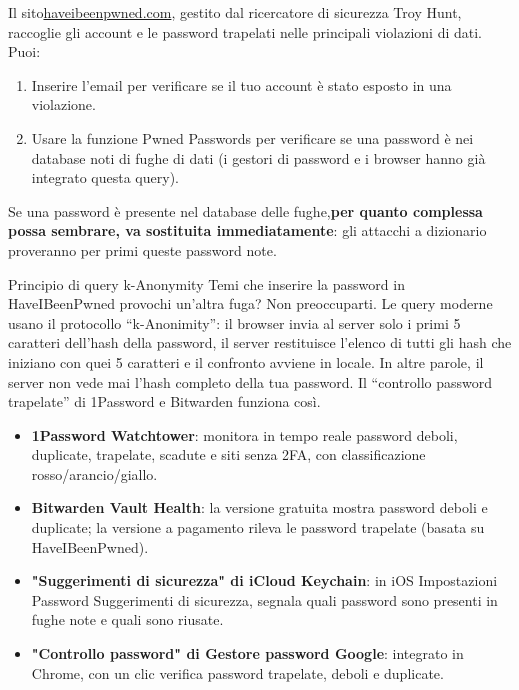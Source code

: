 
Il sito\href{https://haveibeenpwned.com}{haveibeenpwned.com}, gestito dal ricercatore di sicurezza Troy Hunt, raccoglie gli account e le password trapelati nelle principali violazioni di dati. Puoi:

\begin{enumerate}
  \item Inserire l'email per verificare se il tuo account è stato esposto in una violazione.
  \item Usare la funzione Pwned Passwords per verificare se una password è nei database noti di fughe di dati (i gestori di password e i browser hanno già integrato questa query).
\end{enumerate}

Se una password è presente nel database delle fughe,\textbf{per quanto complessa possa sembrare, va sostituita immediatamente}: gli attacchi a dizionario proveranno per primi queste password note.

\begin{tcbinfo}{Principio di query k-Anonymity}
Temi che inserire la password in HaveIBeenPwned provochi un'altra fuga? Non preoccuparti. Le query moderne usano il protocollo “k-Anonimity”: il browser invia al server solo i primi 5 caratteri dell'hash della password, il server restituisce l'elenco di tutti gli hash che iniziano con quei 5 caratteri e il confronto avviene in locale. In altre parole, il server non vede mai l'hash completo della tua password. Il “controllo password trapelate” di 1Password e Bitwarden funziona così.

\end{tcbinfo}


\begin{itemize}
  \item \textbf{1Password Watchtower}: monitora in tempo reale password deboli, duplicate, trapelate, scadute e siti senza 2FA, con classificazione rosso/arancio/giallo.
  \item \textbf{Bitwarden Vault Health}: la versione gratuita mostra password deboli e duplicate; la versione a pagamento rileva le password trapelate (basata su HaveIBeenPwned).
  \item \textbf{"Suggerimenti di sicurezza" di iCloud Keychain}: in iOS Impostazioni Password Suggerimenti di sicurezza, segnala quali password sono presenti in fughe note e quali sono riusate.
  \item \textbf{"Controllo password" di Gestore password Google}: integrato in Chrome, con un clic verifica password trapelate, deboli e duplicate.
\end{itemize}

